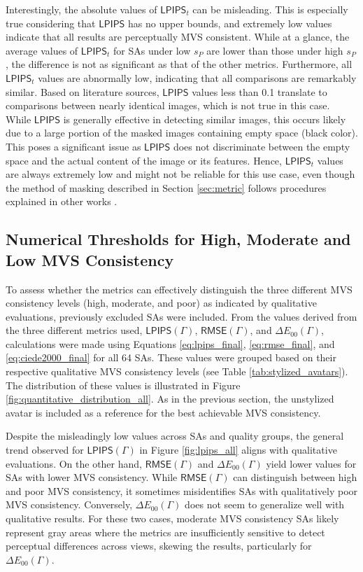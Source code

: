 Interestingly, the absolute values of $\mathsf{LPIPS}_{t}$ can be misleading. This is especially true considering that $\mathsf{LPIPS}$ has no upper bounds, and extremely low values indicate that all results are perceptually MVS consistent. While at a glance, the average values of $\mathsf{LPIPS}_{t}$ for SAs under low $s_P$ are lower than those under high $s_P$, the difference is not as significant as that of the other metrics. Furthermore, all $\mathsf{LPIPS}_{t}$ values are abnormally low, indicating that all comparisons are remarkably similar. Based on literature sources, $\mathsf{LPIPS}$ values less than 0.1 translate to comparisons between nearly identical images, which is not true in this case. While $\mathsf{LPIPS}$ is generally effective in detecting similar images, this occurs likely due to a large portion of the masked images containing empty space (black color). This poses a significant issue as $\mathsf{LPIPS}$ does not discriminate between the empty space and the actual content of the image or its features. Hence, $\mathsf{LPIPS}_{t}$ values are always extremely low and might not be reliable for this use case, even though the method of masking described in Section \ref{sec:metric} follows procedures explained in other works \cite{Mu.2021,Liu.2024}.

\subsection{Numerical Thresholds for High, Moderate and Low MVS Consistency}

To assess whether the metrics can effectively distinguish the three different MVS consistency levels (high, moderate, and poor) as indicated by qualitative evaluations, previously excluded SAs were included. From the values derived from the three different metrics used, $\mathsf{LPIPS}(\varGamma)$, $\mathsf{RMSE}(\varGamma)$, and $\Delta E_{00}(\varGamma)$, calculations were made using Equations \ref{eq:lpips_final}, \ref{eq:rmse_final}, and \ref{eq:ciede2000_final} for all 64 SAs. These values were grouped based on their respective qualitative MVS consistency levels (see Table \ref{tab:stylized_avatars}). The distribution of these values is illustrated in Figure \ref{fig:quantitative_distribution_all}. As in the previous section, the unstylized avatar is included as a reference for the best achievable MVS consistency.

Despite the misleadingly low values across SAs and quality groups, the general trend observed for $\mathsf{LPIPS}(\varGamma)$ in Figure \ref{fig:lpips_all} aligns with qualitative evaluations. On the other hand, $\mathsf{RMSE}(\varGamma)$ and $\Delta E_{00}(\varGamma)$ yield lower values for SAs with lower MVS consistency. While $\mathsf{RMSE}(\varGamma)$ can distinguish between high and poor MVS consistency, it sometimes misidentifies SAs with qualitatively poor MVS consistency. Conversely, $\Delta E_{00}(\varGamma)$ does not seem to generalize well with qualitative results. For these two cases, moderate MVS consistency SAs likely represent gray areas where the metrics are insufficiently sensitive to detect perceptual differences across views, skewing the results, particularly for $\Delta E_{00}(\varGamma)$.

